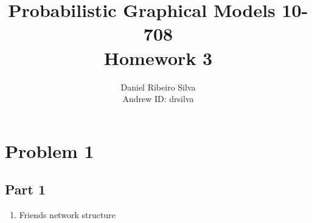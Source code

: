 \documentclass{article}
\title{ \vspace{-5mm}
        Probabilistic Graphical Models 10-708\\
        Homework 3}         %
\author{Daniel Ribeiro Silva\\      %
Andrew ID: drsilva}        %
\begin{document}
\maketitle



\section*{Problem 1}


\subsection*{Part 1}

\begin{enumerate}

\item
Friends network structure\\


\end{enumerate}
\end{document}
